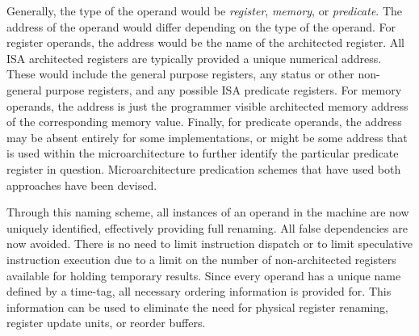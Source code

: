 \documentclass{book}
\begin{document}
Generally, the type of the operand would be \textit{register},
\textit{memory}, or \textit{predicate}.
The address of the operand would differ
depending on the type of the operand.
For register operands, the address would be
the name of the architected register.
All ISA architected registers are typically provided a
unique numerical address.  These would include the
general purpose registers, any status or other non-general
purpose registers, and any possible ISA predicate registers.
For memory operands, the address is just the
programmer visible architected memory address of the corresponding
memory value.
Finally, for predicate operands, the address
may be absent entirely for some implementations, or
might be some address that is used within the microarchitecture
to further identify the particular predicate register in question.
Microarchitecture predication schemes that 
have used both approaches have been devised.

Through this naming scheme, all instances of an operand
in the machine are now uniquely identified, effectively 
providing full renaming.
All false dependencies are now avoided.
There is no need to limit instruction dispatch or to limit speculative
instruction execution due to a limit on the number of non-architected
registers available for holding temporary results.
Since every operand has a unique name defined by a time-tag, 
all necessary ordering information is provided for.
This information can be used 
to eliminate the need for physical register renaming,
register update units, or reorder buffers.
%
%
\end{document}
